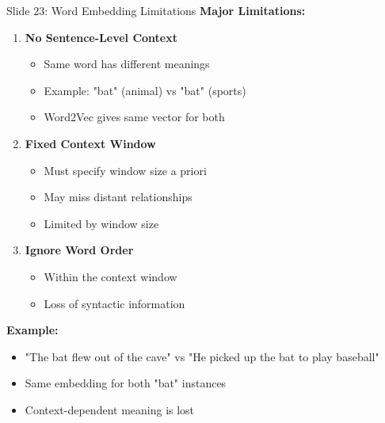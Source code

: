 \documentclass[8pt]{beamer}
\begin{document}
	\begin{frame}{Slide 23: Word Embedding Limitations}
		\fontsize{6.5}{7.5}\selectfont
		\textbf{Major Limitations:}
		\begin{enumerate}
			\item \textbf{No Sentence-Level Context}
			\begin{itemize}
				\item Same word has different meanings
				\item Example: "bat" (animal) vs "bat" (sports)
				\item Word2Vec gives same vector for both
			\end{itemize}
			\item \textbf{Fixed Context Window}
			\begin{itemize}
				\item Must specify window size a priori
				\item May miss distant relationships
				\item Limited by window size
			\end{itemize}
			\item \textbf{Ignore Word Order}
			\begin{itemize}
				\item Within the context window
				\item Loss of syntactic information
			\end{itemize}
		\end{enumerate}
		
		\textcolor{myblue}{\textbf{Example:}}
		\begin{itemize}
			\item "The bat flew out of the cave" vs "He picked up the bat to play baseball"
			\item Same embedding for both "bat" instances
			\item Context-dependent meaning is lost
		\end{itemize}
	\end{frame}
	
\end{document}
